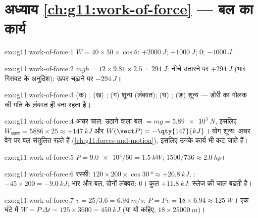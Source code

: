 \section*{अध्याय \ref{ch:g11:work-of-force} --- बल का कार्य}

\begin{solution}{exo:g11:work-of-force:1}
$W = 40 \times 50 \times \cos\theta$: $+\qty{2000}{J}$; $+\qty{1000}{J}$; $0$; $-\qty{1000}{J}$।
\end{solution}

\begin{solution}{exo:g11:work-of-force:2}
$mgh = 12 \times 9.81 \times 2.5 = \qty{294}{J}$: नीचे उतारने पर $+\qty{294}{J}$ (भार गिरावट के अनुदिश); ऊपर चढ़ाने पर
$-\qty{294}{J}$।
\end{solution}

\begin{solution}{exo:g11:work-of-force:3}
(क) ; (ख) ; (ग) शून्य (लंबवत);
(घ) ; (ङ) शून्य --- डोरी का  गोलक की गति के
लंबवत ही बना रहता है।
\end{solution}

\begin{solution}{exo:g11:work-of-force:4}
अचर चाल: उठाने वाला बल $= mg = \qty{5.89e3}{N}$, इसलिए $W_{\text{उठाव}} = 5886 \times 25 \approx +\qty{147}{kJ}$ और $W(\vect P) = -\qty{147}{kJ}$। योग शून्य:
अचर वेग पर बल संतुलित रहते हैं (\cref{ch:g11:forces-and-motion}), इसलिए उनके कार्य भी
कट जाते हैं।
\end{solution}

\begin{solution}{exo:g11:work-of-force:5}
$P = \num{9.0e4}/60 = \qty{1.5}{kW}$; $1500/736 \approx \qty{2.0}{hp}$।
\end{solution}

\begin{solution}{exo:g11:work-of-force:6}
रस्सी: $120 \times 200 \times \cos\qty{30}{\degree} \approx
+\qty{20.8}{kJ}$; : $-45 \times 200 = -\qty{9.0}{kJ}$; भार और  बल,
दोनों लंबवत: $0$। कुल $+\qty{11.8}{kJ}$: स्लेज की चाल बढ़ती है।
\end{solution}

\begin{solution}{exo:g11:work-of-force:7}
$v = 25/3.6 = \qty{6.94}{m/s}$; $P = Fv = 18 \times 6.94 \approx
\qty{125}{W}$। एक घंटे में $W = P\,\Delta t = 125 \times 3600 =
\qty{450}{kJ}$ (या यों कहिए, $18 \times \qty{25000}{m}$)।
\end{solution}

